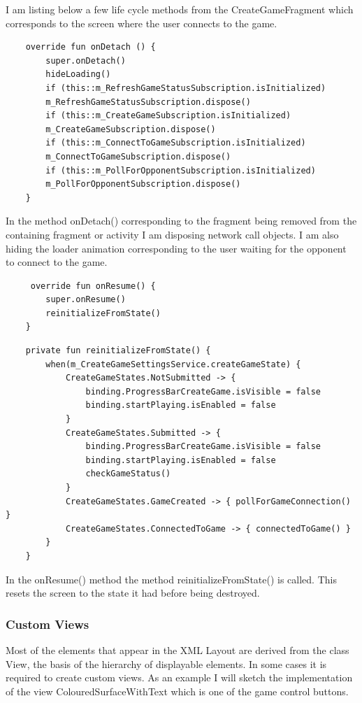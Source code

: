 I am listing below a few life cycle methods from the CreateGameFragment which corresponds to the screen where the user connects to the game.

\begin{lstlisting}
	override fun onDetach () {
		super.onDetach()
		hideLoading()
		if (this::m_RefreshGameStatusSubscription.isInitialized)
		m_RefreshGameStatusSubscription.dispose()
		if (this::m_CreateGameSubscription.isInitialized)
		m_CreateGameSubscription.dispose()
		if (this::m_ConnectToGameSubscription.isInitialized)
		m_ConnectToGameSubscription.dispose()
		if (this::m_PollForOpponentSubscription.isInitialized)
		m_PollForOpponentSubscription.dispose()
	}
\end{lstlisting}

In the method onDetach() corresponding to the fragment being removed from the containing fragment or activity I am disposing network call objects. I am also hiding the loader animation corresponding to the user waiting for the opponent to connect to the game. 

\begin{lstlisting}
	 override fun onResume() {
		super.onResume()
		reinitializeFromState()
	}
\end{lstlisting}

\begin{lstlisting}
	private fun reinitializeFromState() {
		when(m_CreateGameSettingsService.createGameState) {
			CreateGameStates.NotSubmitted -> {
				binding.ProgressBarCreateGame.isVisible = false
				binding.startPlaying.isEnabled = false
			}
			CreateGameStates.Submitted -> {
				binding.ProgressBarCreateGame.isVisible = false
				binding.startPlaying.isEnabled = false
				checkGameStatus()
			}
			CreateGameStates.GameCreated -> { pollForGameConnection() }
			CreateGameStates.ConnectedToGame -> { connectedToGame() }
		}
	}
\end{lstlisting}

In the onResume() method the method reinitializeFromState() is called. This resets the screen to the state it had before being destroyed.

\subsubsection{Custom Views} \label{custom_views}

Most of the elements that appear in the XML Layout are derived from the class View, the basis of the hierarchy of displayable elements. In some cases it is required to create custom views. As an example I will sketch the implementation of the view ColouredSurfaceWithText which is one of the game control buttons.

